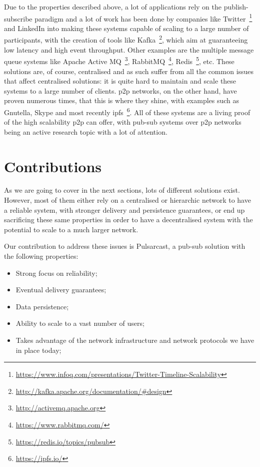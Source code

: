 Due to the properties described above, a lot of applications rely on the
publish-subscribe paradigm and a lot of work has been done by companies like
Twitter~\footnote{\url{https://www.infoq.com/presentations/Twitter-Timeline-Scalability}}
and LinkedIn into making these systems capable of scaling to a large number of
participants, with the creation of tools like
Kafka~\footnote{\url{http://kafka.apache.org/documentation/\#design}}, which
aim at guaranteeing low latency and high event throughput. Other examples are
the multiple message queue systems like Apache Active
MQ~\footnote{\url{http://activemq.apache.org}},
RabbitMQ~\footnote{\url{https://www.rabbitmq.com/}},
Redis~\footnote{\url{https://redis.io/topics/pubsub}}, etc.  These solutions
are, of course, centralised and as such suffer from all the common issues that
affect centralised solutions: it is quite hard to maintain and scale these
systems to a large number of clients. \acrfull{p2p} networks, on the other
hand, have proven numerous times, that this is where they shine, with examples
such as Gnutella, Skype and most recently
\acrshort{ipfs}~\footnote{\url{https://ipfs.io/}}.  All of these systems are a
living proof of the high scalability \acrshort{p2p} can offer, with pub-sub
systems over \acrshort{p2p} networks being an active research topic with a lot
of attention.

\section{Contributions}

As we are going to cover in the next sections, lots of different solutions
exist. However, most of them either rely on a centralised or hierarchic network
to have a reliable system, with stronger delivery and persistence guarantees,
or end up sacrificing these same properties in order to have a decentralised
system with the potential to scale to a much larger network.

Our contribution to address these issues is Pulsarcast, a pub-sub solution with
the following properties:

\begin{itemize}
  \item
    Strong focus on reliability;
  \item
    Eventual delivery guarantees;
  \item
    Data persistence;
  \item
    Ability to scale to a vast number of users;
  \item
    Takes advantage of the network infrastructure and network protocols we have in place today;
\end{itemize}


